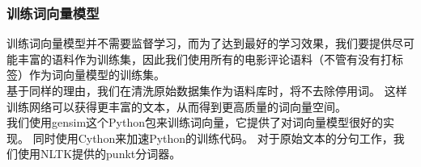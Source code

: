 \subsubsection{训练词向量模型}
训练词向量模型并不需要监督学习，而为了达到最好的学习效果，我们要提供尽可能丰富的语料作为训练集，因此我们使用所有的电影评论语料（不管有没有打标签）作为词向量模型的训练集。\\
基于同样的理由，我们在清洗原始数据集作为语料库时，将不去除停用词。
这样训练网络可以获得更丰富的文本，从而得到更高质量的词向量空间。\\
我们使用gensim这个Python包来训练词向量，它提供了对词向量模型很好的实现。
同时使用Cython来加速Python的训练代码。
对于原始文本的分句工作，我们使用NLTK提供的punkt分词器。
